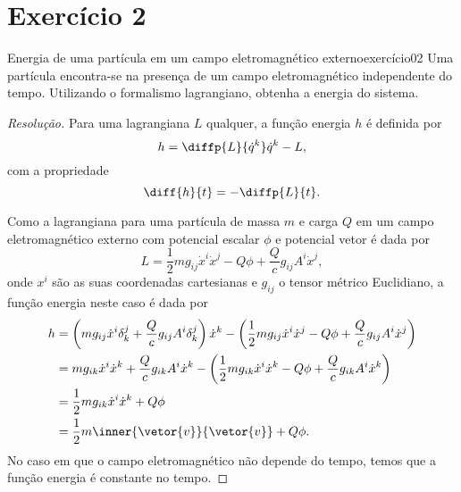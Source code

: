 \section*{Exercício 2}
\begin{exercício}{Energia de uma partícula em um campo eletromagnético externo}{exercício02}
    Uma partícula encontra-se na presença de um campo eletromagnético independente do tempo. Utilizando o formalismo lagrangiano, obtenha a energia do sistema.
\end{exercício}
\begin{proof}[Resolução]
    Para uma lagrangiana \(L\) qualquer, a função energia \(h\) é definida por
    \begin{equation*}
        h = \diffp{L}{\dot{q}^k}\dot{q}^k - L,
    \end{equation*}
    com a propriedade
    \begin{equation*}
        \diff{h}{t} = -\diffp{L}{t}.
    \end{equation*}

    Como a lagrangiana para uma partícula de massa \(m\) e carga \(Q\) em um campo eletromagnético externo com potencial escalar \(\phi\) e potencial vetor  é dada por
    \begin{equation*}
        L = \frac12 m g_{ij} \dot{x}^i \dot{x}^j - Q\phi + \frac{Q}{c} g_{ij} A^i \dot{x}^j,
    \end{equation*}
    onde \(x^i\) são as suas coordenadas cartesianas e \(g_{ij}\) o tensor métrico Euclidiano, a função energia neste caso é dada por
    \begin{align*}
        h &= \left(mg_{ij} \dot{x}^i \delta^j_k + \frac{Q}{c} g_{ij} A^i \delta^j_k\right)\dot{x}^k - \left( \frac12 m g_{ij} \dot{x}^i \dot{x}^j - Q\phi +\frac{Q}{c} g_{ij} A^i \dot{x}^j\right)\\
          &= m g_{ik}\dot{x}^i \dot{x}^k + \frac{Q}{c}g_{ik}A^i\dot{x}^k - \left(\frac12 m g_{ik} \dot{x}^i \dot{x}^k - Q\phi + \frac{Q}{c}g_{ik} A^i \dot{x}^k\right)\\
          &= \frac12 m g_{ik} \dot{x}^i\dot{x}^k + Q\phi\\
          &= \frac12 m \inner{\vetor{v}}{\vetor{v}} + Q\phi.
    \end{align*}
    No caso em que o campo eletromagnético não depende do tempo, temos que a função energia é constante no tempo.
\end{proof}
